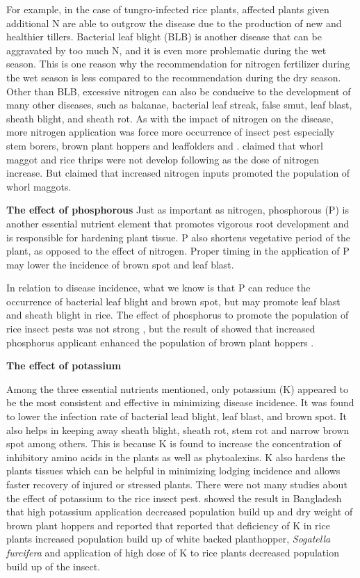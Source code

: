 For example, in the case of tungro-infected rice plants, affected plants given additional N are able to outgrow the disease due to the production of new and healthier tillers. Bacterial leaf blight (BLB) is another disease that can be aggravated by too much N, and it is even more problematic during the wet season. This is one reason why the recommendation for nitrogen fertilizer during the wet season is less compared to the recommendation during the dry season. Other than BLB, excessive nitrogen can also be conducive to the development of many other diseases, such as bakanae, bacterial leaf streak, false smut, leaf blast, sheath blight, and sheath rot.
As with the impact of nitrogen on the disease, more nitrogen application was force more occurrence of insect pest especially stem borers, brown plant hoppers and leaffolders \cite{chau2003impacts} and \cite{rashid2014effect}. \cite{chau2003impacts} claimed that whorl maggot and rice thrips were not develop following as the dose of nitrogen increase. But \cite{litsinger2011cultural} claimed that increased nitrogen inputs promoted the population of whorl maggots.

\textbf{The effect of phosphorous}
Just as important as nitrogen, phosphorous (P) is another essential nutrient element that promotes vigorous root development and is responsible for hardening plant tissue. P also shortens vegetative period of the plant, as opposed to the effect of nitrogen. Proper timing in the application of P may lower the incidence of brown spot and leaf blast. 

In relation to disease incidence, what we know is that P can reduce the occurrence of bacterial leaf blight and brown spot, but may promote leaf blast and sheath blight in rice. The effect of phosphorus to promote the population of rice insect pests was not strong \citet{chau2003impacts, rashid2014effect}, but the result of \cite{rashid2014effect} showed that increased phosphorus applicant enhanced the population of brown plant hoppers .

\textbf{The effect of potassium}

Among the three essential nutrients mentioned, only potassium (K) appeared to be the most consistent and effective in minimizing disease incidence. It was found to lower the infection rate of bacterial lead blight, leaf blast, and brown spot. It also helps in keeping away sheath blight, sheath rot, stem rot and narrow brown spot among others. This is because K is found to increase the concentration of inhibitory amino acids in the plants as well as phytoalexins. K also hardens the plants tissues which can be helpful in minimizing lodging incidence and allows faster recovery of injured or stressed plants. 
There were not many studies about the effect of potassium to the rice insect pest.  \cite{rashid2014effect} showed the result in Bangladesh that high potassium application decreased population build up and dry weight of brown plant hoppers and \cite{salim2002effects} reported that reported that deficiency of K in rice plants increased population build up of white backed planthopper, \textit{Sogatella furcifera} and application of high dose of K to rice plants decreased population build up of the insect.


